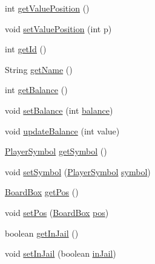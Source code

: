 \begin{DoxyCompactItemize}
int \hyperlink{class_monopoly_1_1_logic_1_1_player_a6b71c11eab1a2335131e0d359aa56fbe}{get\+Value\+Position} ()
\item 
void \hyperlink{class_monopoly_1_1_logic_1_1_player_a417294d3211a47bedafd5b86880f37d4}{set\+Value\+Position} (int p)
\item 
int \hyperlink{class_monopoly_1_1_logic_1_1_player_a02e6e0237ee7b4c32c58d3a2c8020b39}{get\+Id} ()
\item 
String \hyperlink{class_monopoly_1_1_logic_1_1_player_a485b4c3a2c25f882e4826e16a458d7cb}{get\+Name} ()
\item 
int \hyperlink{class_monopoly_1_1_logic_1_1_player_ab4617809f84d2bb5f6393c6414a1bb07}{get\+Balance} ()
\item 
void \hyperlink{class_monopoly_1_1_logic_1_1_player_affbd1fd7e079708a5365a99c9ad1d20e}{set\+Balance} (int \hyperlink{class_monopoly_1_1_logic_1_1_player_adee3b4a4dea242b17568e6d93922a698}{balance})
\item 
void \hyperlink{class_monopoly_1_1_logic_1_1_player_a84dc1edd89e49ed5565b3e8ecbde66fa}{update\+Balance} (int value)
\item 
\hyperlink{class_monopoly_1_1_logic_1_1_player_symbol}{Player\+Symbol} \hyperlink{class_monopoly_1_1_logic_1_1_player_a8676c33cac02c3b2e17c63b06d40ac6c}{get\+Symbol} ()
\item 
void \hyperlink{class_monopoly_1_1_logic_1_1_player_af93d16184072a94055b2cc77d4075028}{set\+Symbol} (\hyperlink{class_monopoly_1_1_logic_1_1_player_symbol}{Player\+Symbol} \hyperlink{class_monopoly_1_1_logic_1_1_player_a0171902866c205d6dfbd11e89ede9ac3}{symbol})
\item 
\hyperlink{class_monopoly_1_1_logic_1_1_board_box}{Board\+Box} \hyperlink{class_monopoly_1_1_logic_1_1_player_a6bb88db582618a97cce059fec9f0f69f}{get\+Pos} ()
\item 
void \hyperlink{class_monopoly_1_1_logic_1_1_player_a83d2f536bf04e85f64c1c4b8919e3b43}{set\+Pos} (\hyperlink{class_monopoly_1_1_logic_1_1_board_box}{Board\+Box} \hyperlink{class_monopoly_1_1_logic_1_1_player_a94388e91629f1f055fed991fd202e1b8}{pos})
\item 
boolean \hyperlink{class_monopoly_1_1_logic_1_1_player_a998ce119ac6845284fc8d52a2d35356e}{get\+In\+Jail} ()
\item 
void \hyperlink{class_monopoly_1_1_logic_1_1_player_ad430c406fde2055804d7ad120eab63d8}{set\+In\+Jail} (boolean \hyperlink{class_monopoly_1_1_logic_1_1_player_a97afe5ab76ab1b1377a9e8243643fcb6}{in\+Jail})
\item 

\end{DoxyCompactItemize}
